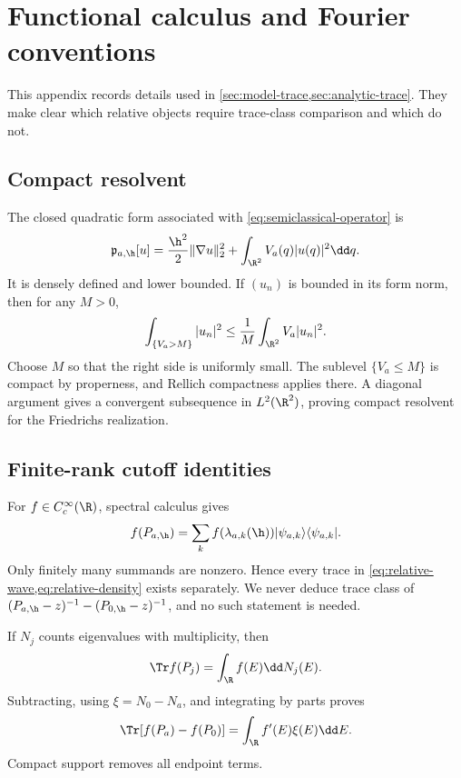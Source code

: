 \section{Functional calculus and Fourier conventions}
\label{app:foundations}

This appendix records details used in \cref{sec:model-trace,sec:analytic-trace}.
They make clear which relative objects require trace-class comparison and
which do not.

\subsection{Compact resolvent}

The closed quadratic form associated with \cref{eq:semiclassical-operator}
is
\begin{equation}
 \mathfrak p_{a,\h}[u]
 =\frac{\h^2}{2}\|\nabla u\|_2^2
 +\int_{\R^2}V_a(q)|u(q)|^2\dd q.
 \label{eq:quadratic-form}
\end{equation}
It is densely defined and lower bounded.  If \((u_n)\) is bounded in its
form norm, then for any \(M>0\),
\begin{equation}
 \int_{\{V_a>M\}}|u_n|^2
 \le \frac{1}{M}\int_{\R^2}V_a|u_n|^2.
 \label{eq:tail-compactness}
\end{equation}
Choose \(M\) so that the right side is uniformly small.  The sublevel
\(\{V_a\le M\}\) is compact by properness, and Rellich compactness applies
there.  A diagonal argument gives a convergent subsequence in
\(L^2(\R^2)\), proving compact resolvent for the Friedrichs realization.

\subsection{Finite-rank cutoff identities}

For \(f\in C_c^\infty(\R)\), spectral calculus gives
\begin{equation}
 f(P_{a,\h})=
 \sum_k f(\lambda_{a,k}(\h))
 |\psi_{a,k}\rangle\langle\psi_{a,k}|.
 \label{eq:spectral-calculus}
\end{equation}
Only finitely many summands are nonzero.  Hence every trace in
\cref{eq:relative-wave,eq:relative-density} exists separately.  We never
deduce trace class of
\((P_{a,\h}-z)^{-1}-(P_{0,\h}-z)^{-1}\), and no such statement is needed.

If \(N_j\) counts eigenvalues with multiplicity, then
\begin{equation}
 \Tr f(P_j)=\int_\R f(E)\dd N_j(E).
 \label{eq:stieltjes-spectral}
\end{equation}
Subtracting, using \(\xi=N_0-N_a\), and integrating by parts proves
\begin{equation}
 \Tr[f(P_a)-f(P_0)]=\int_\R f'(E)\xi(E)\dd E.
 \label{eq:compact-relative-identity}
\end{equation}
Compact support removes all endpoint terms.

